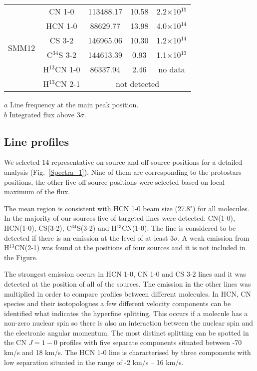 \documentclass{aa}
\begin{document}
\begin{table}
\begin{tabular}{c c c c c}
\multirow{6}{*}{SMM12} & CN 1-0 & 113488.17 & 10.58 & 2.2$\times$10$^{15}$\\
{} & HCN 1-0 & 88629.77 & 13.98 & 4.0$\times$10$^{14}$\\ 
{} & CS 3-2 & 146965.06 & 10.30 & 1.2$\times$10$^{14}$\\  
{} & C$^{34}$S 3-2 & 144613.39 & 0.93 & 1.1$\times$10$^{13}$\\ 
{} & H$^{13}$CN 1-0 & 86337.94 & 2.46 & no data\\ 
{} & H$^{13}$CN 2-1 & \multicolumn{3}{c}{not detected}  \\  \hline
\end{tabular}
\begin{flushleft}
$a$ Line frequency at the main peak position. \\
$b$ Integrated flux above 3$\sigma$.\\
\end{flushleft}
\end{table}

\subsection{Line profiles}

We selected 14 representative on-source and off-source positions for a detailed analysis (Fig.~\ref{Spectra_1}). Nine of them are corresponding to the protostars positions, the other five off-source positions were selected based on local maximum of the flux.  

The mean region is consistent with HCN 1-0 beam size (27.8") for all molecules. In the majority of our sources five of targeted lines were detected: CN(1-0), HCN(1-0), CS(3-2), C$^{34}$S(3-2) and H$^{13}$CN(1-0). The line is considered to be detected if there is an emission at the level of at least 3$\sigma$. A weak emission from H$^{13}$CN(2-1) was found at the positions of four sources and it is not included in the Figure. 

The strongest emission occurs in HCN 1-0, CN 1-0 and CS 3-2 lines and it was detected at the position of all of the sources. The emission in the other lines was multiplied in order to compare profiles between different molecules. In HCN, CN species and their isotopologues a few different velocity components can be identified what indicates the hyperfine splitting. This occurs if a molecule has a non-zero nuclear spin so there is also an interaction between the nuclear spin and the electronic angular momentum. The most distinct splitting can be spotted in the CN $J = 1-0$ profiles with five separate components situated between -70 km/s and 18 km/s. The HCN 1-0 line is characterised by three components with low separation situated in the range of -2 km/s – 16 km/s. 
\end{document}
